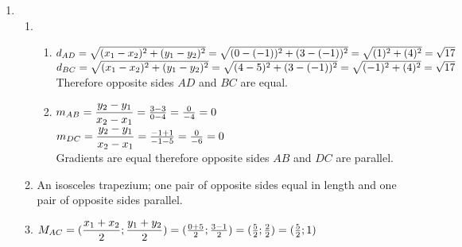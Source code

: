 \begin{eocsolutions}{}
{\begin{enumerate}[itemsep=5pt, label=\textbf{\arabic*}. ]
\begin{enumerate}[itemsep=5pt, label=\textbf{(\alph*)} ]
$d_{CD} = \sqrt{(x_1-x_2)^2+(y_1-y_2)^2}\\
    = \sqrt{(1-1)^2+(7-3)^2}\\
    = \sqrt{0+(4)^2}\\
    = \sqrt{16}\\
    = 4$\\

$d_{DA} = \sqrt{(x_1-x_2)^2+(y_1-y_2)^2}\\
    = \sqrt{(1-3)^2+(3-2)^2}\\
    = \sqrt{(-2)^2+(1)^2}\\
    = \sqrt{5}$\\
\end{enumerate}
\item  %
    \begin{enumerate}[itemsep=5pt, label=\textbf{(\alph*)} ] 
\item 
\begin{enumerate}[noitemsep, label=\textbf{\roman*}. ] 
\item
$d_{AD} = \sqrt{(x_1-x_2)^2+(y_1-y_2)^2}\\
    = \sqrt{(0-(-1))^2+(3-(-1))^2}\\
    = \sqrt{(1)^2+(4)^2}\\
    = \sqrt{17}$\\

$d_{BC} = \sqrt{(x_1-x_2)^2+(y_1-y_2)^2}\\
    = \sqrt{(4-5)^2+(3-(-1))^2}\\
    = \sqrt{(-1)^2+(4)^2}\\
    = \sqrt{17}$\\
Therefore opposite sides $AD$ and $BC$ are equal.\\
\item
$m_{AB} = \dfrac{y_2-y_1}{x_2-x_1}\\
    = \frac{3-3}{0-4}\\
    = \frac{0}{-4}\\
    = 0$\\
$m_{DC} = \dfrac{y_2-y_1}{x_2-x_1}\\
    = \frac{-1+1}{-1-5}\\
    = \frac{0}{-6}\\
    = 0$\\
Gradients are equal therefore opposite sides $AB$ and $DC$ are parallel.\\
\end{enumerate}
\item An isosceles trapezium; one pair of opposite sides equal in length and one pair of opposite sides parallel.
\item
$M_{AC} = (\dfrac{x_1+x_2}{2};\dfrac{y_1+y_2}{2})\\[4pt]
    = (\frac{0+5}{2};\frac{3-1}{2})\\
    = (\frac{5}{2};\frac{2}{2})\\
    = (\frac{5}{2};1)$\\


\end{enumerate}
\end{enumerate}}
\end{eocsolutions}

